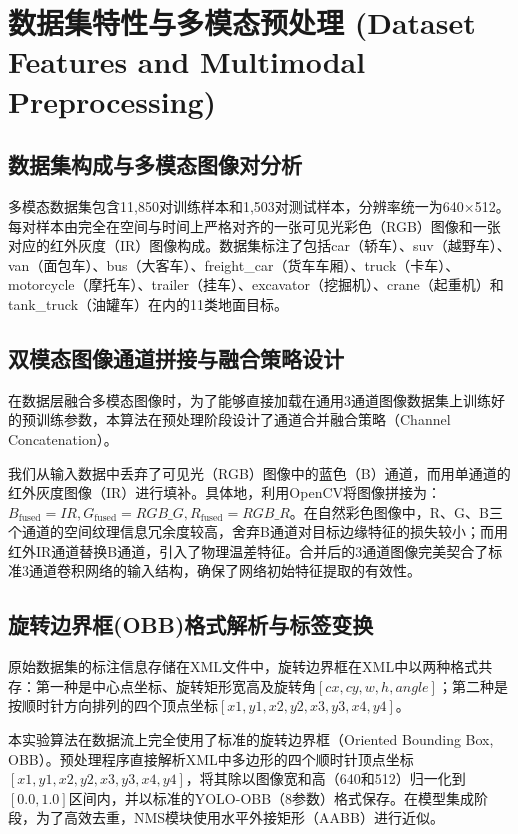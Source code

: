 \documentclass[utf8,a4paper,zihao=-4]{ctexart}
\begin{document}
\section{数据集特性与多模态预处理 (Dataset Features and Multimodal Preprocessing)}

\subsection{数据集构成与多模态图像对分析}
多模态数据集包含11,850对训练样本和1,503对测试样本，分辨率统一为640×512。每对样本由完全在空间与时间上严格对齐的一张可见光彩色（RGB）图像和一张对应的红外灰度（IR）图像构成。数据集标注了包括car（轿车）、suv（越野车）、van（面包车）、bus（大客车）、freight\_car（货车车厢）、truck（卡车）、motorcycle（摩托车）、trailer（挂车）、excavator（挖掘机）、crane（起重机）和tank\_truck（油罐车）在内的11类地面目标。

\subsection{双模态图像通道拼接与融合策略设计}
在数据层融合多模态图像时，为了能够直接加载在通用3通道图像数据集上训练好的预训练参数，本算法在预处理阶段设计了通道合并融合策略（Channel Concatenation）。

我们从输入数据中丢弃了可见光（RGB）图像中的蓝色（B）通道，而用单通道的红外灰度图像（IR）进行填补。具体地，利用OpenCV将图像拼接为：$B_{\text{fused}} = IR, G_{\text{fused}} = RGB\_G, R_{\text{fused}} = RGB\_R$。在自然彩色图像中，R、G、B三个通道的空间纹理信息冗余度较高，舍弃B通道对目标边缘特征的损失较小；而用红外IR通道替换B通道，引入了物理温差特征。合并后的3通道图像完美契合了标准3通道卷积网络的输入结构，确保了网络初始特征提取的有效性。

\subsection{旋转边界框(OBB)格式解析与标签变换}
原始数据集的标注信息存储在XML文件中，旋转边界框在XML中以两种格式共存：第一种是中心点坐标、旋转矩形宽高及旋转角$[cx, cy, w, h, angle]$；第二种是按顺时针方向排列的四个顶点坐标$[x1, y1, x2, y2, x3, y3, x4, y4]$。

本实验算法在数据流上完全使用了标准的旋转边界框（Oriented Bounding Box, OBB）。预处理程序直接解析XML中多边形的四个顺时针顶点坐标$[x1, y1, x2, y2, x3, y3, x4, y4]$，将其除以图像宽和高（640和512）归一化到$[0.0, 1.0]$区间内，并以标准的YOLO-OBB（8参数）格式保存。在模型集成阶段，为了高效去重，NMS模块使用水平外接矩形（AABB）进行近似。
\end{document}
